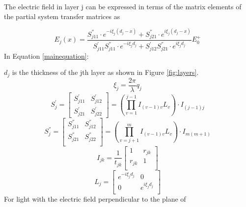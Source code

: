 \documentclass{article}
\begin{document}
The electric field in layer j can be expressed in terms of the matrix elements
of the partial system transfer matrices as

\begin{equation}
{{E}_{j}}(x)=\frac{S_{j11}^{''}\cdot {{e}^{-i{{\xi
}_{j}}({{d}_{j}}-x)}}+S_{j21}^{''}\cdot {{e}^{i{{\xi }_{j}}({{d}_{j}}-x)}}}{S_{j11}^{'}S_{j11}^{''}\cdot {{e}^{-i{{\xi }_{j}}{{d}_{j}}}}+S_{j12}^{'}S_{j21}^{''}\cdot {{e}^{i{{\xi }_{j}}{{d}_{j}}}}}E_{0}^{+}
\label{mainequation} 
\end{equation}
In Equation \ref{mainequation}:

$d_j$ is the thickness of the jth layer as shown in Figure \ref{fig:layers}.
\begin{equation}
{{\xi }_{j}}=\frac{2\pi }{\lambda }{{q}_{j}}
\end{equation}
\begin{equation}
S_{j}^{'}=\left[ \begin{matrix}
   S_{j11}^{'} & S_{j12}^{'}\\
   S_{j21}^{'} & S_{j22}^{'}  
\end{matrix} \right]=\left( \prod\limits_{v=1}^{j-1}{{{I}_{(v-1)v}}{{L}_{v}}} \right)\cdot {{I}_{(j-1)j}}
\label{Sp} 
\end{equation}
\begin{equation}
S_{j}^{''}=\left[ \begin{matrix}
   S_{j11}^{''} & S_{j12}^{''}\\
   S_{j21}^{''} & S_{j22}^{''}\\
\end{matrix} \right]=\left( \prod\limits_{v=j+1}^{m}{{{I}_{(v-1)v}}{{L}_{v}}} \right)\cdot {{I}_{m(m+1)}}
\label{Spp} 
\end{equation}
\begin{equation}
{{I}_{jk}}=\frac{1}{{{t}_{jk}}}\left[ \begin{matrix}
   1 & {{r}_{jk}}  \\
   {{r}_{jk}} & 1  \\
\end{matrix} \right]
\end{equation}
\begin{equation}
{{L}_{j}}=\left[ \begin{matrix}
   {{e}^{-i{{\xi }_{j}}{{d}_{j}}}} & 0  \\
   0 & {{e}^{i{{\xi }_{j}}{{d}_{j}}}}  \\
\end{matrix} \right]
\end{equation}
For light with the electric field perpendicular to the plane of
\end{document}
